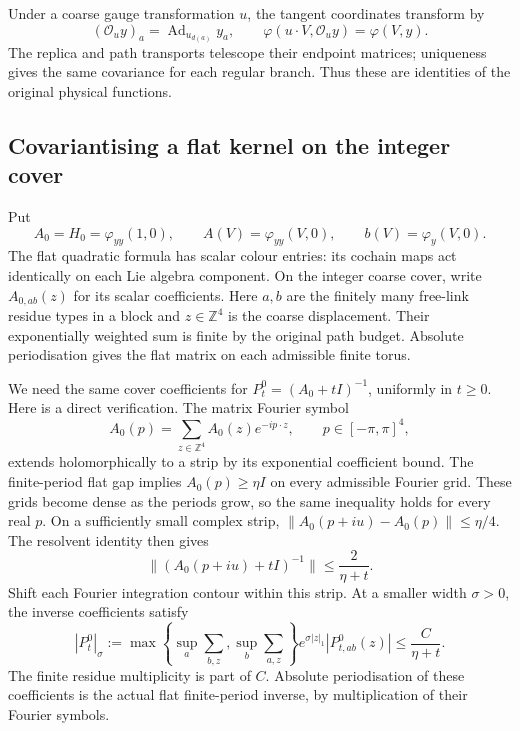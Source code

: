 \documentclass[11pt,reqno]{amsart}
\numberwithin{equation}{section}
\theoremstyle{definition}
\theoremstyle{remark}
\begin{document}
Under a coarse gauge transformation \(u\),
the tangent coordinates transform by
\[
          (\mathcal O_u y)_a
                      =\operatorname{Ad}_{u_{d(a)}}y_a,
          \qquad
          \varphi(u\cdot V,\mathcal O_u y)=\varphi(V,y).
\]
The replica and path transports telescope
their endpoint matrices; uniqueness gives
the same covariance for each regular branch.
Thus these are identities of the original
physical functions.

\subsection{Covariantising a flat kernel on the integer cover}

Put
\[
             A_0=H_0=\varphi_{yy}(1,0),\qquad
             A(V)=\varphi_{yy}(V,0),\qquad
             b(V)=\varphi_y(V,0).
\]
The flat quadratic formula has scalar colour
entries: its cochain maps act identically
on each Lie algebra component.
On the integer coarse cover, write
\(A_{0,ab}(z)\) for its scalar coefficients.
Here \(a,b\) are the finitely many free-link
residue types in a block and \(z\in\mathbb Z^4\)
is the coarse displacement.
Their exponentially weighted sum is finite
by the original path budget.
Absolute periodisation gives the flat matrix
on each admissible finite torus.

We need the same cover coefficients for
\(P_t^0=(A_0+tI)^{-1}\), uniformly in \(t\ge0\).
Here is a direct verification.
The matrix Fourier symbol
\[
             A_0(p)=\sum_{z\in\mathbb Z^4}
                              A_0(z)e^{-ip\cdot z},
                    \qquad p\in[-\pi,\pi]^4,
\]
extends holomorphically to a strip by its
exponential coefficient bound.
The finite-period flat gap implies
\(A_0(p)\ge\eta I\) on every admissible Fourier
grid. These grids become dense as the periods
grow, so the same inequality holds for every
real \(p\).
On a sufficiently small complex strip,
\(\|A_0(p+iu)-A_0(p)\|\le\eta/4\).
The resolvent identity then gives
\[
             \|(A_0(p+iu)+tI)^{-1}\|
                                    \le\frac2{\eta+t}.
\]
Shift each Fourier integration contour within
this strip. At a smaller width \(\sigma>0\),
the inverse coefficients satisfy
\begin{equation}
       |P_t^0|_\sigma:=
       \max\left\{\sup_a\sum_{b,z},
                  \sup_b\sum_{a,z}\right\}
            e^{\sigma|z|_1}|P_{t,ab}^0(z)|
                                 \le\frac C{\eta+t}.
 \label{eq:compatible-flat-cover-resolvent}
\end{equation}
The finite residue multiplicity is part of \(C\).
Absolute periodisation of these coefficients
is the actual flat finite-period inverse,
by multiplication of their Fourier symbols.
\end{document}
